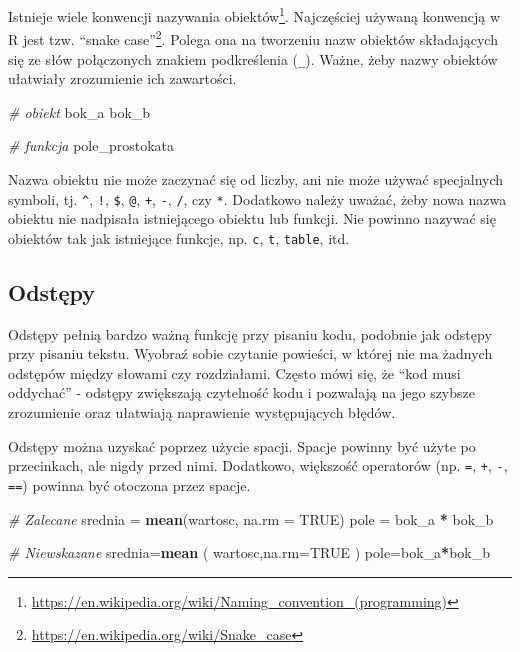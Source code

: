 \documentclass[paper=6in:9in,pagesize=pdftex,headinclude=on,footinclude=on,10pt]{scrbook}
\newenvironment{Shaded}{\begin{snugshade}}{\end{snugshade}}
\newcommand{\CommentTok}[1]{\textcolor[rgb]{0.56,0.35,0.01}{\textit{#1}}}
\newcommand{\DataTypeTok}[1]{\textcolor[rgb]{0.13,0.29,0.53}{#1}}
\newcommand{\KeywordTok}[1]{\textcolor[rgb]{0.13,0.29,0.53}{\textbf{#1}}}
\newcommand{\NormalTok}[1]{#1}
\newcommand{\OperatorTok}[1]{\textcolor[rgb]{0.81,0.36,0.00}{\textbf{#1}}}
\newcommand{\OtherTok}[1]{\textcolor[rgb]{0.56,0.35,0.01}{#1}}
\newcommand{\StringTok}[1]{\textcolor[rgb]{0.31,0.60,0.02}{#1}}
\DeclareRobustCommand{\href}[2]{#2\footnote{\url{#1}}}
\begin{document}
Istnieje wiele konwencji nazywania obiektów\footnote{\url{https://en.wikipedia.org/wiki/Naming_convention_(programming)}}.
Najczęściej używaną konwencją w R jest tzw. \href{https://en.wikipedia.org/wiki/Snake_case}{``snake case''}.
Polega ona na tworzeniu nazw obiektów składających się ze słów połączonych znakiem podkreślenia (\texttt{\_}).
Ważne, żeby nazwy obiektów ułatwiały zrozumienie ich zawartości.

\begin{Shaded}
\begin{Highlighting}[]
\CommentTok{# obiekt}
\NormalTok{bok_a}
\NormalTok{bok_b}

\CommentTok{# funkcja}
\NormalTok{pole_prostokata}
\end{Highlighting}
\end{Shaded}

Nazwa obiektu nie może zaczynać się od liczby, ani nie może używać specjalnych symboli, tj. \texttt{\^{}}, \texttt{!}, \texttt{\$}, \texttt{@}, \texttt{+}, \texttt{-}, \texttt{/}, czy \texttt{*}.
Dodatkowo należy uważać, żeby nowa nazwa obiektu nie nadpisała istniejącego obiektu lub funkcji.
Nie powinno nazywać się obiektów tak jak istniejące funkcje, np. \texttt{c}, \texttt{t}, \texttt{table}, itd.

\hypertarget{odstux119py}{%
\subsection{Odstępy}\label{odstux119py}}

Odstępy pełnią bardzo ważną funkcję przy pisaniu kodu, podobnie jak odstępy przy pisaniu tekstu.
Wyobraź sobie czytanie powieści, w której nie ma żadnych odstępów między słowami czy rozdziałami.
Często mówi się, że ``kod musi oddychać'' - odstępy zwiększają czytelność kodu i pozwalają na jego szybsze zrozumienie oraz ułatwiają naprawienie występujących błędów.

Odstępy można uzyskać poprzez użycie spacji.
Spacje powinny być użyte po przecinkach, ale nigdy przed nimi.
Dodatkowo, większość operatorów (np. \texttt{=}, \texttt{+}, \texttt{-}, \texttt{==}) powinna być otoczona przez spacje.

\begin{Shaded}
\begin{Highlighting}[]
\CommentTok{# Zalecane}
\NormalTok{srednia =}\StringTok{ }\KeywordTok{mean}\NormalTok{(wartosc, }\DataTypeTok{na.rm =} \OtherTok{TRUE}\NormalTok{)}
\NormalTok{pole =}\StringTok{ }\NormalTok{bok_a }\OperatorTok{*}\StringTok{ }\NormalTok{bok_b}

\CommentTok{# Niewskazane}
\NormalTok{srednia=}\KeywordTok{mean}\NormalTok{ ( wartosc,}\DataTypeTok{na.rm=}\OtherTok{TRUE}\NormalTok{ ) }
\NormalTok{pole=bok_a}\OperatorTok{*}\NormalTok{bok_b}
\end{Highlighting}
\end{Shaded}
\end{document}
